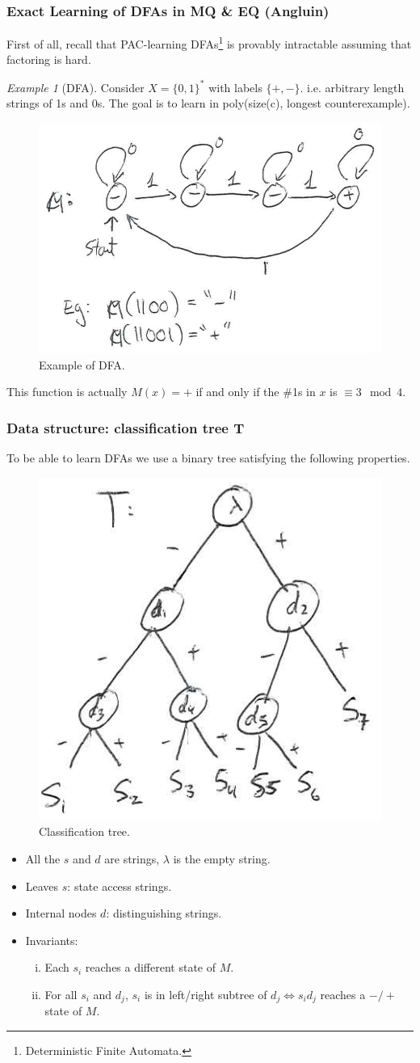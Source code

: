 \documentclass[12pt, letterpaper]{article}
\numberwithin{equation}{section} %
\theoremstyle{definition}
\theoremstyle{remark}
\newtheorem{example}[theorem]{Example}
\begin{document}
\subsubsection{Exact Learning of DFAs in MQ \& EQ (Angluin)}
First of all, recall that PAC-learning DFAs\footnote{Deterministic Finite Automata.}  is provably intractable assuming that factoring is hard.
\begin{example}[DFA]
Consider $X=\lbrace 0, 1\rbrace^*$ with labels $\lbrace +, -\rbrace$. i.e. arbitrary length strings of 1s and 0s. The goal is to learn in poly(size(c), longest counterexample).
\begin{figure}[H]
\centering
\includegraphics[width=0.6\linewidth]{img/dfa.png}
\caption{Example of DFA.}
\end{figure}
This function is actually $M(x) = +$ if and only if the \#1s in $x$ is $\equiv 3 \mod 4$.
\end{example}

\subsubsection*{Data structure: classification tree T}
To be able to learn DFAs we use a binary tree satisfying the following properties.
\begin{figure}[H]
\centering
\includegraphics[width=0.3\linewidth]{img/dfa-tree.png}
\caption{Classification tree.}
\end{figure}
\begin{itemize}
\item All the $s$ and $d$ are strings, $\lambda$ is the empty string.
\item Leaves $s$: state access strings.
\item Internal nodes $d$: distinguishing strings.
\item Invariants:
    \begin{enumerate}[i)]
    \item Each $s_i$ reaches a different state of $M$.
    \item For all $s_i$ and $d_j$, $s_i$ is in left/right subtree of $d_j \iff s_id_j$ reaches a $-/+$ state of $M$.
    \end{enumerate}
\end{itemize}
\end{document}
